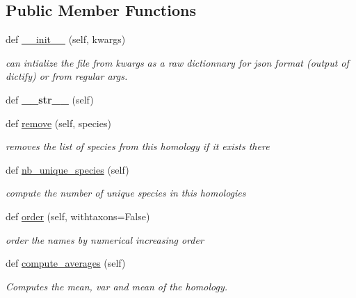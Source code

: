 \subsection*{Public Member Functions}
\begin{DoxyCompactItemize}
\item 
\mbox{\label{class_py_c_u_b_1_1homology_1_1homology_a441a70cdc5814708841f5d3c29548203}} 
def \mbox{\hyperlink{class_py_c_u_b_1_1homology_1_1homology_a441a70cdc5814708841f5d3c29548203}{\+\_\+\+\_\+init\+\_\+\+\_\+}} (self, kwargs)
\begin{DoxyCompactList}\small\item\em can intialize the file from kwargs as a raw dictionnary for json format (output of dictify) or from regular args. \end{DoxyCompactList}\item 
\mbox{\label{class_py_c_u_b_1_1homology_1_1homology_af27d98c4ced0023053744c7ba038b33a}} 
def {\bfseries \+\_\+\+\_\+str\+\_\+\+\_\+} (self)
\item 
def \mbox{\hyperlink{class_py_c_u_b_1_1homology_1_1homology_a32017c483bad9a5c4498640279a79634}{remove}} (self, species)
\begin{DoxyCompactList}\small\item\em removes the list of species from this homology if it exists there \end{DoxyCompactList}\item 
def \mbox{\hyperlink{class_py_c_u_b_1_1homology_1_1homology_ad430899a462da76cdd6e1fc6ee73e0ec}{nb\+\_\+unique\+\_\+species}} (self)
\begin{DoxyCompactList}\small\item\em compute the number of unique species in this homologies \end{DoxyCompactList}\item 
def \mbox{\hyperlink{class_py_c_u_b_1_1homology_1_1homology_a513d82c775ba47678304c97572eaf932}{order}} (self, withtaxons=False)
\begin{DoxyCompactList}\small\item\em order the names by numerical increasing order \end{DoxyCompactList}\item 
def \mbox{\hyperlink{class_py_c_u_b_1_1homology_1_1homology_aaeb164cd217a4746ff0082da1a92fc5e}{compute\+\_\+averages}} (self)
\begin{DoxyCompactList}\small\item\em Computes the mean, var and mean of the homology. \end{DoxyCompactList}\item 

\end{DoxyCompactItemize}
